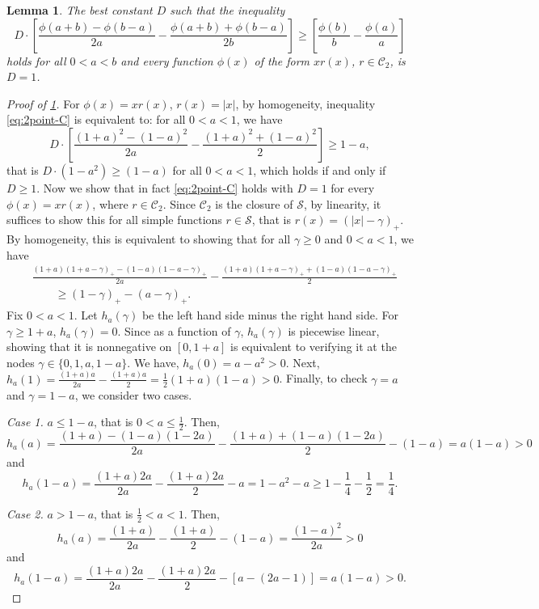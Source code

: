 \documentclass[10pt]{article}
\newcommand{\1}{\textbf{1}}
\newtheorem{lemma}[theorem]{Lemma}
\theoremstyle{remark}
\theoremstyle{definition}
\begin{document}
\begin{lemma}\label{lm:2point-C}
The best constant $D$ such that the inequality
\begin{equation}\label{eq:2point-C}
D\cdot\left[\frac{\phi(a+b)-\phi(b-a)}{2a} - \frac{\phi(a+b)+\phi(b-a)}{2b}\right] \geq \left[ \frac{\phi(b)}{b}-\frac{\phi(a)}{a}\right]
\end{equation}
holds for all $0 < a < b$ and every function $\phi(x)$ of the form $xr(x)$, $r \in \mathcal{C}_2$, is $D=1$.
\end{lemma}
\begin{proof}[Proof of \ref{lm:2point-C}]
For $\phi(x) = xr(x)$, $r(x) = |x|$, by homogeneity, inequality \eqref{eq:2point-C} is equivalent to: for all $0 < a < 1$, we have
\[
D\cdot\left[\frac{(1+a)^2-(1-a)^2}{2a} - \frac{(1+a)^2+(1-a)^2}{2}\right] \geq 1-a,
\]
that is $D\cdot(1-a^2) \geq (1-a)$ for all $0 < a < 1$, which holds if and only if $D \geq 1$. Now we show that in fact \eqref{eq:2point-C} holds with $D=1$ for every $\phi(x) = xr(x)$, where $r \in \mathcal{C}_2$. Since $\mathcal{C}_2$ is the closure of $\mathcal{S}$, by linearity, it suffices to show this for all simple functions $r \in \mathcal{S}$, that is $r(x) = (|x|-\gamma)_+$. By homogeneity, this is equivalent to showing that for all $\gamma \geq 0$ and $0 < a < 1$, we have
\begin{align*}
&\frac{(1+a)(1+a-\gamma)_+-(1-a)(1-a-\gamma)_+}{2a} - \frac{(1+a)(1+a-\gamma)_++(1-a)(1-a-\gamma)_+}{2} \\
&\qquad\geq  (1-\gamma)_+-(a-\gamma)_+.
\end{align*}
Fix $0 < a < 1$. Let $h_a(\gamma)$ be the left hand side minus the right hand side. For $\gamma \geq 1+a$, $h_a(\gamma) = 0$. Since as a function of $\gamma$, $h_a(\gamma)$ is piecewise linear, showing that it is nonnegative on $[0,1+a]$ is equivalent to verifying it at the nodes $\gamma \in \{0, 1, a, 1-a\}$. We have, $h_a(0) = a-a^2 > 0$. Next, $h_a(1) = \frac{(1+a)a}{2a} - \frac{(1+a)a}{2} = \frac{1}{2}(1+a)(1-a) > 0$. Finally, to check $\gamma = a$ and $\gamma = 1-a$, we consider two cases.

\bigskip
\noindent
\emph{Case 1.} $a \leq 1-a$, that is $0< a \leq \frac{1}{2}$. Then,
\[
h_a(a) = \frac{(1+a)-(1-a)(1-2a)}{2a} - \frac{(1+a)+(1-a)(1-2a)}{2} - (1-a) = a(1-a) > 0
\]
and
\[
h_a(1-a) = \frac{(1+a)2a}{2a} - \frac{(1+a)2a}{2}-a = 1-a^2-a \geq 1 - \frac{1}{4} - \frac{1}{2} = \frac{1}{4}.
\]


\bigskip
\noindent
\emph{Case 2.} $a > 1-a$, that is $\frac{1}{2} < a <1$. Then,
\[
h_a(a) = \frac{(1+a)}{2a} - \frac{(1+a)}{2} - (1-a) = \frac{(1-a)^2}{2a} > 0
\]
and
\[
h_a(1-a) = \frac{(1+a)2a}{2a} - \frac{(1+a)2a}{2}-[a-(2a-1)] = a(1-a) > 0.
\]
\end{proof}
\end{document}
